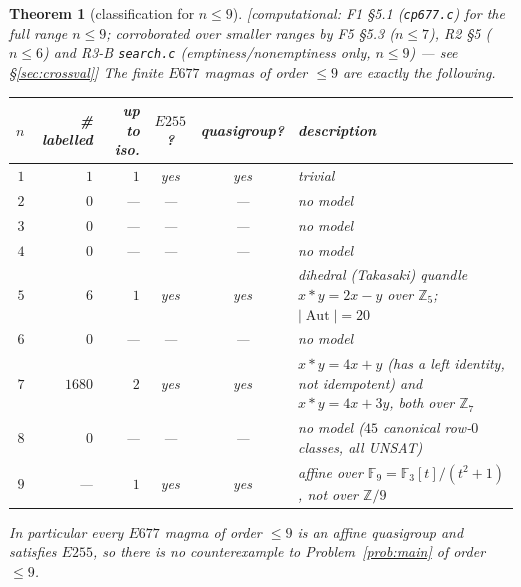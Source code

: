 \documentclass[11pt]{article}
\theoremstyle{plain}
\newtheorem{theorem}{Theorem}[section]
\theoremstyle{definition}
\theoremstyle{remark}
\numberwithin{equation}{section}
\newcommand{\Z}{\mathbb{Z}}
\newcommand{\F}{\mathbb{F}}
\newcommand{\op}{\mathbin{*}}
\newcommand{\Aut}{\operatorname{Aut}}
\newcommand{\statusbox}[1]{{\small\sloppy\textsf{[#1]}}}
\newcommand{\COMP}[1]{\statusbox{computational: #1}}
\begin{document}
\begin{theorem}[classification for $n\le 9$]\label{thm:small}
\COMP{F1 \S5.1 (\texttt{cp677.c}) for the full range $n\le9$; corroborated over smaller
ranges by F5 \S5.3 ($n\le7$), R2 \S5 ($n\le6$) and R3-B \texttt{search.c}
(emptiness/nonemptiness only, $n\le9$) --- see \S\ref{sec:crossval}}
The finite $E677$ magmas of order $\le 9$ are exactly the following.
\begin{center}
{\small
\begin{tabular}{rrrccp{}}
\toprule
$n$ & \# labelled & up to iso. & $E255$? & quasi\-group? & description\\
\midrule
$1$ & $1$ & $1$ & yes & yes & trivial\\
$2$ & $0$ & --- & --- & --- & \emph{no model}\\
$3$ & $0$ & --- & --- & --- & \emph{no model}\\
$4$ & $0$ & --- & --- & --- & \emph{no model}\\
$5$ & $6$ & $1$ & yes & yes & dihedral (Takasaki) quandle $x\op y = 2x-y$ over $\Z_5$;
$|\Aut| = 20$\\
$6$ & $0$ & --- & --- & --- & \emph{no model}\\
$7$ & $1680$ & $2$ & yes & yes & $x\op y = 4x+y$ (has a left identity, not idempotent) and
$x\op y = 4x+3y$, both over $\Z_7$\\
$8$ & $0$ & --- & --- & --- & \emph{no model} ($45$ canonical row-$0$ classes, all UNSAT)\\
$9$ & --- & $1$ & yes & yes & affine over $\F_9 = \F_3[t]/(t^2+1)$, \emph{not} over $\Z/9$\\
\bottomrule
\end{tabular}}
\end{center}
In particular every $E677$ magma of order $\le 9$ is an affine quasigroup and satisfies
$E255$, so there is no counterexample to Problem~\ref{prob:main} of order $\le 9$.
\end{theorem}
\end{document}
